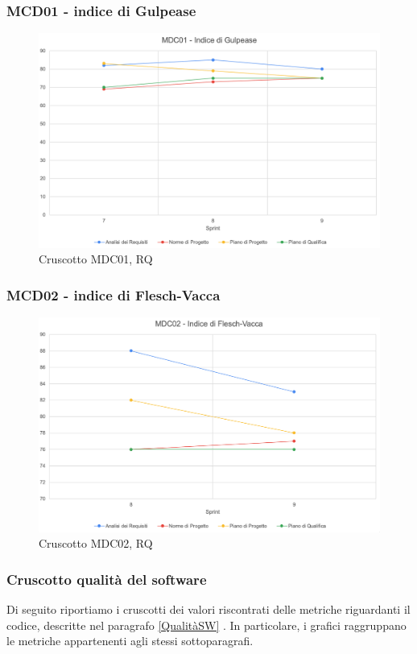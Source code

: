 \subsubsection*{MCD01 - indice di Gulpease}
\begin{figure}[H]
    \centering
    \includegraphics[scale = 0.6]{immagini/GulpeaseRQ.png}
    \caption{Cruscotto MDC01, RQ}
\end{figure}

\subsubsection*{MCD02 - indice di Flesch-Vacca}
\begin{figure}[H]
    \centering
    \includegraphics[scale = 0.6]{immagini/fleschRQ.png}
    \caption{Cruscotto MDC02, RQ}
\end{figure}
\newpage
\subsubsection{Cruscotto  qualità del software}
Di seguito riportiamo i cruscotti dei valori riscontrati delle metriche riguardanti il codice, descritte nel paragrafo \ref{QualitàSW} . In particolare, i grafici raggruppano le metriche appartenenti agli stessi sottoparagrafi.

